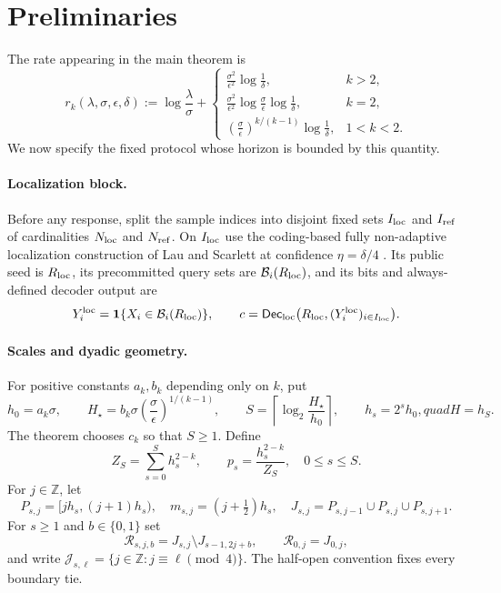 \section{Preliminaries}\label{sec:preliminaries}

The rate appearing in the main theorem is
\[
r_k(\lambda,\sigma,\epsilon,\delta)
:=\log\frac{\lambda}{\sigma}+
\begin{cases}
\displaystyle \frac{\sigma^2}{\epsilon^2}\log\frac1\delta,
  & k>2,\\[0.6em]
\displaystyle \frac{\sigma^2}{\epsilon^2}
  \log\frac{\sigma}{\epsilon}\log\frac1\delta,
  & k=2,\\[0.6em]
\displaystyle \left(\frac{\sigma}{\epsilon}\right)^{k/(k-1)}
  \log\frac1\delta,
  & 1<k<2.
\end{cases}
\]
We now specify the fixed protocol whose horizon is bounded by this quantity.

\paragraph{Localization block.}
Before any response, split the sample indices into disjoint fixed sets
$I_{\rm loc}$ and $I_{\rm ref}$ of cardinalities $N_{\rm loc}$ and
$N_{\rm ref}$.  On $I_{\rm loc}$ use the coding-based fully non-adaptive
localization construction of Lau and Scarlett at confidence
$\eta=\delta/4$ \citep[Theorem~16 and Appendix~``Two-stage
estimator'']{lau-scarlett-2026}.  Its public seed is $R_{\rm loc}$, its
precommitted query sets are $\mathcal B_i(R_{\rm loc})$, and its bits and
always-defined decoder output are
\[
Y_i^{\rm loc}=\mathbf 1\{X_i\in\mathcal B_i(R_{\rm loc})\},\qquad
c=\mathsf{Dec}_{\rm loc}
 \bigl(R_{\rm loc},(Y_i^{\rm loc})_{i\in I_{\rm loc}}\bigr).
\]

\paragraph{Scales and dyadic geometry.}
For positive constants $a_k,b_k$ depending only on $k$, put
\[
h_0=a_k\sigma,\qquad
H_\star=b_k\sigma\left(\frac\sigma\epsilon\right)^{1/(k-1)},
\qquad
S=\left\lceil\log_2\frac{H_\star}{h_0}\right\rceil,
\qquad h_s=2^sh_0,quad H=h_S.
\]
The theorem chooses $c_k$ so that $S\geq1$.  Define
\[
Z_S=\sum_{s=0}^S h_s^{2-k},\qquad
p_s=\frac{h_s^{2-k}}{Z_S},\quad 0\leq s\leq S.
\]
For $j\in\mathbb Z$, let
\[
P_{s,j}=[jh_s,(j+1)h_s),\quad
m_{s,j}=(j+\tfrac12)h_s,\quad
J_{s,j}=P_{s,j-1}\cup P_{s,j}\cup P_{s,j+1}.
\]
For $s\geq1$ and $b\in\{0,1\}$ set
\[
\mathcal R_{s,j,b}=J_{s,j}\setminus J_{s-1,2j+b},
\qquad \mathcal R_{0,j}=J_{0,j},
\]
and write $\mathcal J_{s,\ell}=\{j\in\mathbb Z:j\equiv\ell\pmod4\}$.
The half-open convention fixes every boundary tie.

